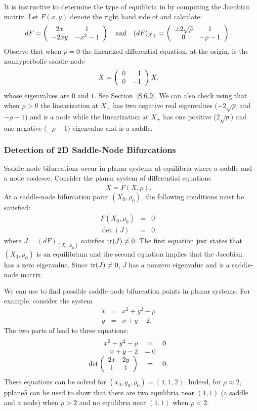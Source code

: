 It is instructive to determine the type of equilibria in  by
computing the Jacobian matrix.  Let $F(x,y)$ denote the right hand side of 
 and calculate:
\begin{equation}  \label{E:SNJ}
dF = \left(\begin{array}{cc} 2x & 1\\ -2xy &-x^2-1\end{array}\right) \quad\mbox{and}\quad 
(dF)_{X_{\pm}}= \left(\begin{array}{cc} \pm 2\sqrt{\rho} & 1\\ 0 &-\rho-1\end{array}\right).
\end{equation}
Observe that when $\rho=0$ the linearized differential equation, at the origin, 
is the nonhyperbolic saddle-node
\[
\dot{X} = \left(\begin{array}{rr} 0 & 1\\ 0 &-1\end{array}\right)X,
\]
whose eigenvalues are $0$ and $1$.  See Section~\ref{S:6.9}. We can also check
using  that when $\rho>0$ the linearization at $X_{-}$ has two 
negative real eigenvalues ($-2\sqrt{\rho}$ and $-\rho-1$)  and is a node 
while the linearization at $X_{+}$ has one positive ($2\sqrt{\rho}$) and one 
negative ($-\rho-1$) eigenvalue and is a saddle.


\subsubsection*{Detection of 2D Saddle-Node Bifurcations}

Saddle-node bifurcations occur in planar systems at equilibria  where a 
saddle and a node coalesce.  Consider the planar system of differential 
equations
\[
\dot{X} = F(X,\rho).
\]
At a saddle-node bifurcation point $(X_0,\rho_0)$, the following conditions
must be satisfied:
\begin{equation}  \label{E:DCSN2}
\begin{array}{rcl}
F(X_0,\rho_0) & = & 0\\
\det(J) & = & 0.
\end{array}
\end{equation}
where $J = (dF)_{(X_0,\rho_0)}$ satisfies ${\rm tr}(J)\neq 0$.  The first 
equation just states that $(X_0,\rho_0)$ is an equilibrium and the second 
equation implies that the Jacobian has a zero eigenvalue.  Since 
${\rm tr}(J)\neq 0$, $J$ has a nonzero eigenvalue and is a saddle-node matrix.

We can use  to find possible saddle-node bifurcation points in
planar systems.  For example, consider the system
\[
\begin{array}{rcl} 
\dot{x} & = & x^2 + y^2 - \rho\\
\dot{y} & = & x + y -2.
\end{array}
\]
The two parts of  lead to three equations:
\[
\begin{array}{rcl} 
x^2 + y^2 - \rho & = & 0\\
x + y -2 & = 0\\
\det\left(\begin{array}{cc} 2x & 2y\\ 1 &1\end{array}\right) & = & 0.
\end{array}
\]
These equations can be solved for $(x_0,y_0,\rho_0)=(1,1,2)$.  Indeed, for 
$\rho\approx 2$, {\sf pplane5} can be used to show that there are two 
equilibria near $(1,1)$ (a saddle and a node) when $\rho>2$ and no 
equilibria near $(1,1)$ when $\rho<2$.



